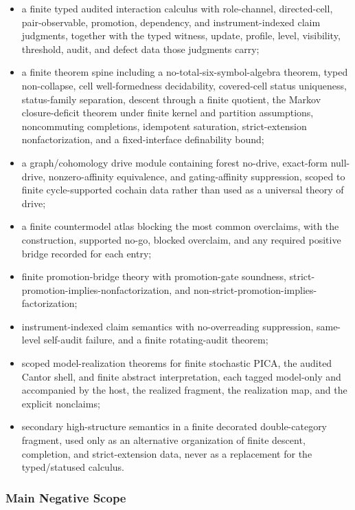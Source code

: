 \documentclass[11pt]{article}
\providecommand{\tightlist}{}
\theoremstyle{definition}
\begin{document}
\begin{itemize}
\tightlist
\item
  a finite typed audited interaction calculus with role-channel, directed-cell, pair-observable, promotion, dependency, and instrument-indexed claim judgments, together with the typed witness, update, profile, level, visibility, threshold, audit, and defect data those judgments carry;
\item
  a finite theorem spine including a no-total-six-symbol-algebra theorem, typed non-collapse, cell well-formedness decidability, covered-cell status uniqueness, status-family separation, descent through a finite quotient, the Markov closure-deficit theorem under finite kernel and partition assumptions, noncommuting completions, idempotent saturation, strict-extension nonfactorization, and a fixed-interface definability bound;
\item
  a graph/cohomology drive module containing forest no-drive, exact-form null-drive, nonzero-affinity equivalence, and gating-affinity suppression, scoped to finite cycle-supported cochain data rather than used as a universal theory of drive;
\item
  a finite countermodel atlas blocking the most common overclaims, with the construction, supported no-go, blocked overclaim, and any required positive bridge recorded for each entry;
\item
  finite promotion-bridge theory with promotion-gate soundness, strict-promotion-implies-nonfactorization, and non-strict-promotion-implies-factorization;
\item
  instrument-indexed claim semantics with no-overreading suppression, same-level self-audit failure, and a finite rotating-audit theorem;
\item
  scoped model-realization theorems for finite stochastic PICA, the audited Cantor shell, and finite abstract interpretation, each tagged model-only and accompanied by the host, the realized fragment, the realization map, and the explicit nonclaims;
\item
  secondary high-structure semantics in a finite decorated double-category fragment, used only as an alternative organization of finite descent, completion, and strict-extension data, never as a replacement for the typed/statused calculus.
\end{itemize}

\subsubsection{Main Negative Scope}
\end{document}
